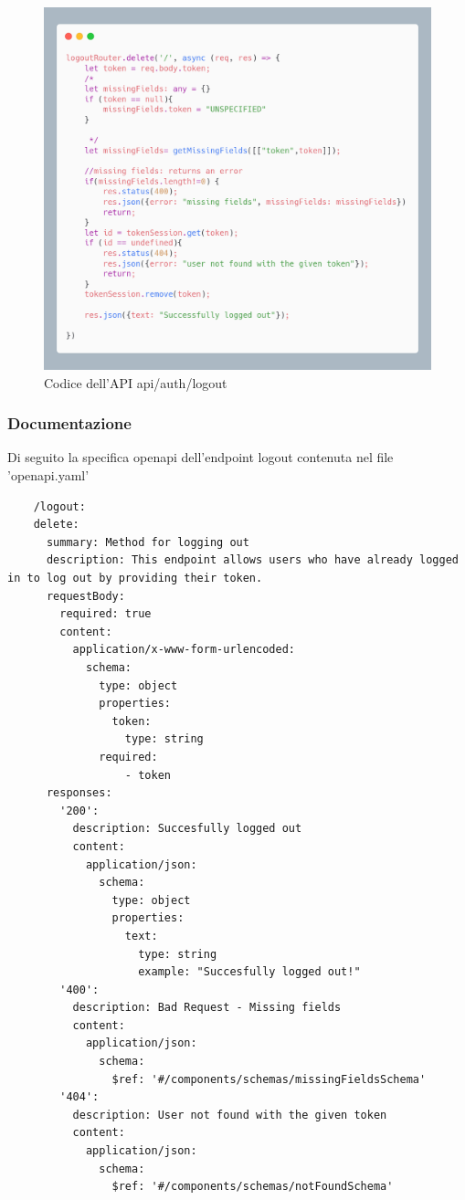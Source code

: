 \documentclass{report}
\begin{document}
\begin{figure}[H]
	\centering\includegraphics[width=1\textwidth]{images/microservizio-autenticazione/logout-carbon.png}
	Codice dell'API api/auth/logout
\end{figure}
\subsubsection*{Documentazione}
Di seguito la specifica openapi dell'endpoint logout contenuta nel file 'openapi.yaml'
\begin{verbatim}
	/logout:
    delete:
      summary: Method for logging out 
      description: This endpoint allows users who have already logged in to log out by providing their token.
      requestBody:
        required: true
        content:
          application/x-www-form-urlencoded:
            schema:
              type: object
              properties:
                token:
                  type: string
              required:
                  - token
      responses:
        '200':
          description: Succesfully logged out
          content:
            application/json:
              schema:
                type: object
                properties:
                  text:
                    type: string
                    example: "Succesfully logged out!"
        '400':
          description: Bad Request - Missing fields 
          content:
            application/json:
              schema:
                $ref: '#/components/schemas/missingFieldsSchema'
        '404':
          description: User not found with the given token
          content:
            application/json:
              schema:
                $ref: '#/components/schemas/notFoundSchema'
	
\end{verbatim}
\end{document}
